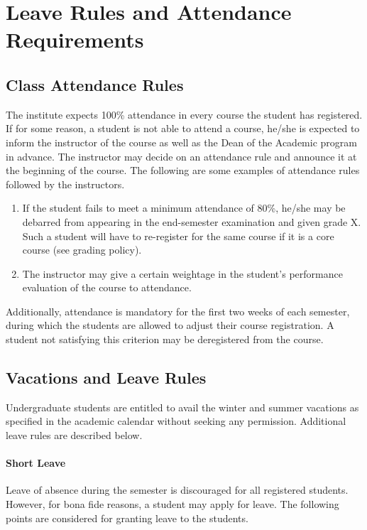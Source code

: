 \section{Leave Rules and Attendance Requirements}

\subsection{Class Attendance Rules}

The institute expects 100\% attendance in every course the student has registered. If for some reason, a student is not able to attend a course, he/she is expected to inform the instructor of the course as well as the Dean of the Academic program in advance. The instructor may decide on an attendance rule and announce it at the beginning of the course. The following are some examples of attendance rules followed by the instructors.

\begin{enumerate}[leftmargin=15mm]
    \item If the student fails to meet a minimum attendance of 80\%, he/she may be debarred from appearing in the end-semester examination and given grade X. Such a student will have to re-register for the same course if it is a core course (see grading policy).
    \item The instructor may give a certain weightage in the student’s performance evaluation of the course to attendance.
\end{enumerate}

Additionally, attendance is mandatory for the first two weeks of each semester, during which the students are allowed to adjust their course registration. A student not satisfying this criterion may be deregistered from the course.

\subsection{Vacations and Leave Rules}

Undergraduate students are entitled to avail the winter and summer vacations as specified in the academic calendar without seeking any permission. Additional leave rules are described below.

\paragraph{Short Leave} Leave of absence during the semester is discouraged for all registered students. However, for bona fide reasons, a student may apply for leave. The following points are considered for granting leave to the students.

